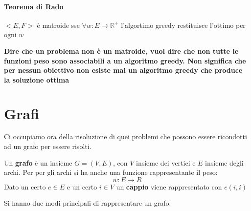 \documentclass[a4paper,12pt, oneside]{book}
\begin{document}
\subsubsection{Teorema di Rado}
\begin{teorema}
  $<E,F>$ è matroide sse $\forall w:E\to \mathbb{R}^+$ l'algortimo
  greedy restituisce l'ottimo per ogni $w$
\end{teorema}
\textbf{Dire che un problema non è un matroide, vuol dire
che non tutte le funzioni peso sono associabili a un algoritmo
greedy. Non significa che per nessun obiettivo non esiste mai un
algoritmo greedy che produce la soluzione ottima}
\chapter{Grafi}
Ci occupiamo ora della risoluzione di quei problemi che possono essere
ricondotti ad un grafo per essere risolti.
\begin{definizione}
Un \textbf{grafo} è un insieme $G=(V,E)$, con $V$ insieme dei vertici
e $E$ insieme degli archi. Per per gli archi si ha anche una funzione
rappresentante il peso:
\[w:E\to\mathit{R}\]
Dato un certo $e\in E$ e un certo $i\in V$ un \textbf{cappio} viene
rappresentato con $e(i,i)$
\end{definizione}
Si hanno due modi principali di rappresentare un grafo:
\end{document}
